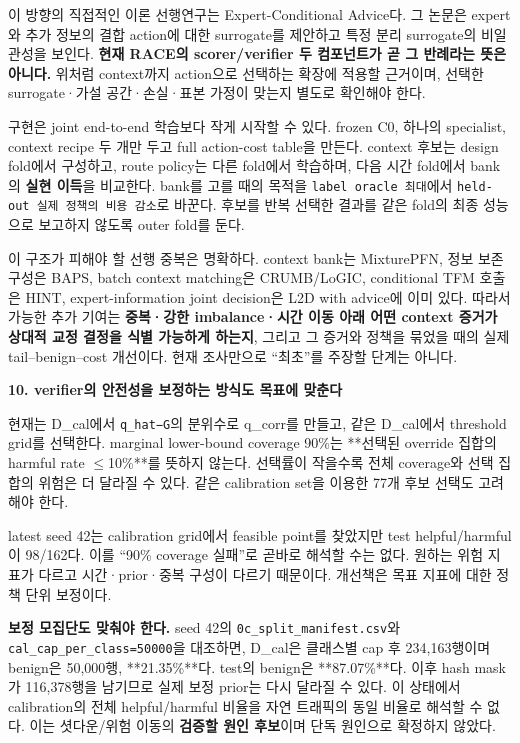 이 방향의 직접적인 이론 선행연구는 Expert-Conditional Advice다. 그 논문은 expert와 추가 정보의 결합 action에 대한 surrogate를 제안하고 특정 분리 surrogate의 비일관성을 보인다. \textbf{현재 RACE의 scorer/\allowbreak{}verifier 두 컴포넌트가 곧 그 반례라는 뜻은 아니다.} 위처럼 context까지 action으로 선택하는 확장에 적용할 근거이며, 선택한 surrogate·가설 공간·손실·표본 가정이 맞는지 별도로 확인해야 한다.

구현은 joint end-to-end 학습보다 작게 시작할 수 있다. frozen C0, 하나의 specialist, context recipe 두 개만 두고 full action-cost table을 만든다. context 후보는 design fold에서 구성하고, route policy는 다른 fold에서 학습하며, 다음 시간 fold에서 bank의 \textbf{실현 이득}을 비교한다. bank를 고를 때의 목적을 \texttt{label or\allowbreak{}acle 최대}에서 \texttt{held-\allowbreak{}out\allowbreak{} 실제 정책의 \allowbreak{}비용 감소}로 바꾼다. 후보를 반복 선택한 결과를 같은 fold의 최종 성능으로 보고하지 않도록 outer fold를 둔다.

이 구조가 피해야 할 선행 중복은 명확하다. context bank는 MixturePFN, 정보 보존 구성은 BAPS, batch context matching은 CRUMB/\allowbreak{}LoGIC, conditional TFM 호출은 HINT, expert-information joint decision은 L2D with advice에 이미 있다. 따라서 가능한 추가 기여는 \textbf{중복·강한 imbalance·시간 이동 아래 어떤 context 증거가 상대적 교정 결정을 식별 가능하게 하는지}, 그리고 그 증거와 정책을 묶었을 때의 실제 tail–benign–cost 개선이다. 현재 조사만으로 “최초”를 주장할 단계는 아니다.

\textbf{10. verifier의 안전성을 보정하는 방식도 목표에 맞춘다}

현재는 D\_\allowbreak{}cal에서 \texttt{q\_\allowbreak{}\allowbreak{}hat−G}의 분위수로 q\_\allowbreak{}corr를 만들고, 같은 D\_\allowbreak{}cal에서 threshold grid를 선택한다. marginal lower-bound coverage 90\%는 **선택된 override 집합의 harmful rate \ensuremath{\leq}10\%**를 뜻하지 않는다. 선택률이 작을수록 전체 coverage와 선택 집합의 위험은 더 달라질 수 있다. 같은 calibration set을 이용한 77개 후보 선택도 고려해야 한다.

latest seed 42는 calibration grid에서 feasible point를 찾았지만 test helpful/\allowbreak{}harmful이 98/\allowbreak{}162다. 이를 “90\% coverage 실패”로 곧바로 해석할 수는 없다. 원하는 위험 지표가 다르고 시간·prior·중복 구성이 다르기 때문이다. 개선책은 목표 지표에 대한 정책 단위 보정이다.

\textbf{보정 모집단도 맞춰야 한다.} seed 42의 \texttt{0c\_\allowbreak{}\allowbreak{}split\allowbreak{}\_\allowbreak{}\allowbreak{}manifes\allowbreak{}t.\allowbreak{}csv}와 \texttt{cal\_\allowbreak{}\allowbreak{}cap\_\allowbreak{}\allowbreak{}per\_\allowbreak{}\allowbreak{}clas\allowbreak{}s=\allowbreak{}\allowbreak{}50000}을 대조하면, D\_\allowbreak{}cal은 클래스별 cap 후 234,163행이며 benign은 50,000행, **21.35\%**다. test의 benign은 **87.07\%**다. 이후 hash mask가 116,378행을 남기므로 실제 보정 prior는 다시 달라질 수 있다. 이 상태에서 calibration의 전체 helpful/\allowbreak{}harmful 비율을 자연 트래픽의 동일 비율로 해석할 수 없다. 이는 셧다운/\allowbreak{}위험 이동의 \textbf{검증할 원인 후보}이며 단독 원인으로 확정하지 않았다.

